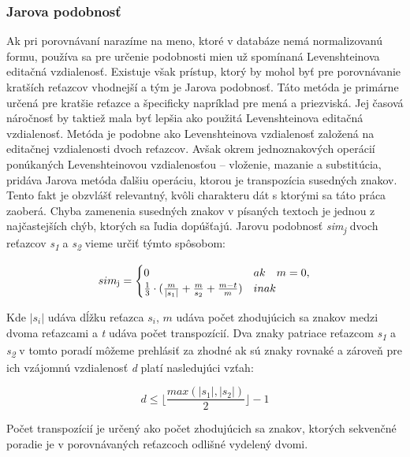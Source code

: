 \subsubsection{Jarova podobnosť}
Ak pri porovnávaní narazíme na meno, ktoré v databáze nemá normalizovanú formu,
používa sa pre určenie podobnosti mien už spomínaná Levenshteinova editačná
vzdialenosť. Existuje však prístup, ktorý by mohol byť pre porovnávanie kratších reťazcov vhodnejší a tým je Jarova podobnosť. Táto metóda je primárne určená pre kratšie reťazce a špecificky
napríklad pre mená a priezviská. Jej časová náročnosť by taktiež mala byť lepšia ako použitá
Levenshteinova editačná vzdialenosť. Metóda je podobne ako Levenshteinova vzdialenosť
založená na editačnej vzdialenosti dvoch reťazcov. Avšak okrem jednoznakových operácií
ponúkaných Levenshteinovou vzdialenosťou – vloženie, mazanie a substitúcia, pridáva
Jarova metóda ďalšiu operáciu, ktorou je transpozícia susedných znakov. Tento fakt je
obzvlášť relevantný, kvôli charakteru dát s ktorými sa táto práca zaoberá. Chyba zamenenia
susedných znakov v písaných textoch je jednou z najčastejších chýb, ktorých sa ľudia
dopúšťajú. Jarovu podobnosť \textit{sim\textsubscript{j}} dvoch reťazcov \textit{s\textsubscript{1}} a \textit{s\textsubscript{2}} vieme určiť týmto spôsobom:

\begin{equation*}
    sim\textsubscript{j} = 
\begin{cases} 0  &  ak \quad m = 0, \\
              \frac{1}{3} \cdot (\frac{m}{\mid s_{1}\mid} + \frac{m}{s_{2}} + \frac{m - t}{m})  &  inak \end{cases}
\end{equation*}

Kde $|s_{i}|$ udáva dĺžku reťazca $s_{i}$, $m$ udáva počet zhodujúcich sa znakov medzi dvoma
reťazcami a \textit{t} udáva počet transpozícií. Dva znaky patriace reťazcom \textit{s\textsubscript{1}} a \textit{s\textsubscript{2}} v tomto poradí
môžeme prehlásiť za zhodné ak sú znaky rovnaké a zároveň pre ich vzájomnú vzdialenosť \textit{d} platí nasledujúci vzťah:

\begin{equation*}
    d \leq \Bigg \lfloor \frac{max(|s_{1}|, |s_{2}|)}{2} \Bigg \rfloor - 1
\end{equation*}

Počet transpozícií je určený ako počet zhodujúcich sa znakov, ktorých sekvenčné poradie je
v porovnávaných reťazcoch odlišné vydelený dvomi.

